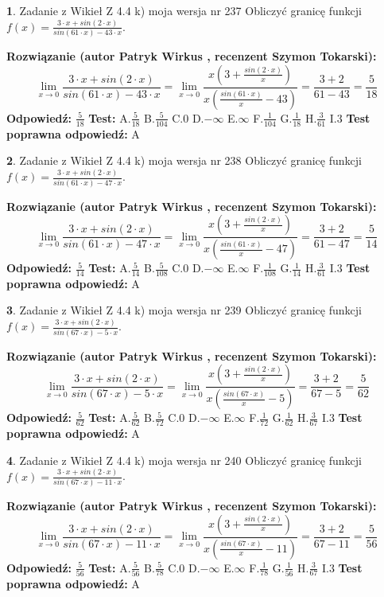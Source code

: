 \documentclass[12pt, a4paper]{article}
\theoremstyle{definition} %
\newtheorem{zad}{}
\newcommand{\zadStart}[1]{\begin{zad}#1\newline}
\newcommand{\zadStop}{\end{zad}}
\newcommand{\rozwStart}[2]{\noindent \textbf{Rozwiązanie (autor #1 , recenzent #2): }\newline}
\newcommand{\rozwStop}{\newline}
\newcommand{\odpStart}{\noindent \textbf{Odpowiedź:}\newline}
\newcommand{\odpStop}{\newline}
\newcommand{\testStart}{\noindent \textbf{Test:}\newline}
\newcommand{\testStop}{\newline}
\newcommand{\kluczStart}{\noindent \textbf{Test poprawna odpowiedź:}\newline}
\newcommand{\kluczStop}{\newline}
\begin{document}
\zadStart{Zadanie z Wikieł Z 4.4 k) moja wersja nr 237}
Obliczyć granicę funkcji $f(x)=\frac{3\cdot x +sin(2\cdot x)}{sin(61\cdot x) -43\cdot x}$.
\zadStop
\rozwStart{Patryk Wirkus}{Szymon Tokarski}
$$\lim\limits_{x\to 0}\frac{3\cdot x +sin(2\cdot x)}{sin(61\cdot x) -43\cdot x}
=\lim\limits_{x\to 0}\frac{x(3+\frac{sin(2\cdot x)}{x})}{x(\frac{sin(61\cdot x)}{x}-43)}
=\frac{3+2}{61-43} = \frac{5}{18}$$
\rozwStop
\odpStart
$\frac{5}{18}$
\odpStop
\testStart
A.$\frac{5}{18}$
B.$\frac{5}{104}$
C.$0$
D.$-\infty$
E.$\infty$
F.$\frac{1}{104}$
G.$\frac{1}{18}$
H.$\frac{3}{61}$
I.$3$
\testStop
\kluczStart
A
\kluczStop



\zadStart{Zadanie z Wikieł Z 4.4 k) moja wersja nr 238}
Obliczyć granicę funkcji $f(x)=\frac{3\cdot x +sin(2\cdot x)}{sin(61\cdot x) -47\cdot x}$.
\zadStop
\rozwStart{Patryk Wirkus}{Szymon Tokarski}
$$\lim\limits_{x\to 0}\frac{3\cdot x +sin(2\cdot x)}{sin(61\cdot x) -47\cdot x}
=\lim\limits_{x\to 0}\frac{x(3+\frac{sin(2\cdot x)}{x})}{x(\frac{sin(61\cdot x)}{x}-47)}
=\frac{3+2}{61-47} = \frac{5}{14}$$
\rozwStop
\odpStart
$\frac{5}{14}$
\odpStop
\testStart
A.$\frac{5}{14}$
B.$\frac{5}{108}$
C.$0$
D.$-\infty$
E.$\infty$
F.$\frac{1}{108}$
G.$\frac{1}{14}$
H.$\frac{3}{61}$
I.$3$
\testStop
\kluczStart
A
\kluczStop



\zadStart{Zadanie z Wikieł Z 4.4 k) moja wersja nr 239}
Obliczyć granicę funkcji $f(x)=\frac{3\cdot x +sin(2\cdot x)}{sin(67\cdot x) -5\cdot x}$.
\zadStop
\rozwStart{Patryk Wirkus}{Szymon Tokarski}
$$\lim\limits_{x\to 0}\frac{3\cdot x +sin(2\cdot x)}{sin(67\cdot x) -5\cdot x}
=\lim\limits_{x\to 0}\frac{x(3+\frac{sin(2\cdot x)}{x})}{x(\frac{sin(67\cdot x)}{x}-5)}
=\frac{3+2}{67-5} = \frac{5}{62}$$
\rozwStop
\odpStart
$\frac{5}{62}$
\odpStop
\testStart
A.$\frac{5}{62}$
B.$\frac{5}{72}$
C.$0$
D.$-\infty$
E.$\infty$
F.$\frac{1}{72}$
G.$\frac{1}{62}$
H.$\frac{3}{67}$
I.$3$
\testStop
\kluczStart
A
\kluczStop



\zadStart{Zadanie z Wikieł Z 4.4 k) moja wersja nr 240}
Obliczyć granicę funkcji $f(x)=\frac{3\cdot x +sin(2\cdot x)}{sin(67\cdot x) -11\cdot x}$.
\zadStop
\rozwStart{Patryk Wirkus}{Szymon Tokarski}
$$\lim\limits_{x\to 0}\frac{3\cdot x +sin(2\cdot x)}{sin(67\cdot x) -11\cdot x}
=\lim\limits_{x\to 0}\frac{x(3+\frac{sin(2\cdot x)}{x})}{x(\frac{sin(67\cdot x)}{x}-11)}
=\frac{3+2}{67-11} = \frac{5}{56}$$
\rozwStop
\odpStart
$\frac{5}{56}$
\odpStop
\testStart
A.$\frac{5}{56}$
B.$\frac{5}{78}$
C.$0$
D.$-\infty$
E.$\infty$
F.$\frac{1}{78}$
G.$\frac{1}{56}$
H.$\frac{3}{67}$
I.$3$
\testStop
\kluczStart
A
\kluczStop
\end{document}
